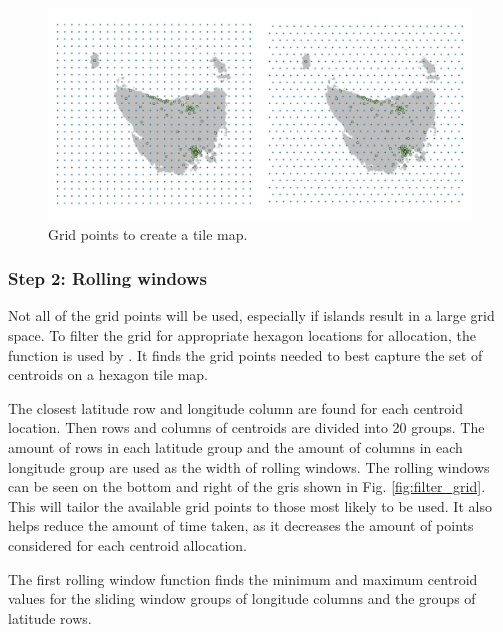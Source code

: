\documentclass[
]{jss}
\begin{document}
\begin{CodeChunk}
\begin{figure}

{\centering \includegraphics[width=1\linewidth]{figures/2grid} 

}

\caption[Grid points to create a tile map]{Grid points to create a tile map.}\label{fig:grid2}
\end{figure}
\end{CodeChunk}

\hypertarget{step-2-rolling-windows}{%
\subsubsection{Step 2: Rolling windows}\label{step-2-rolling-windows}}

Not all of the grid points will be used, especially if islands result in
a large grid space. To filter the grid for appropriate hexagon locations
for allocation, the  function is used by
. It finds the grid points needed to best capture the
set of centroids on a hexagon tile map.

The closest latitude row and longitude column are found for each
centroid location. Then rows and columns of centroids are divided into
20 groups. The amount of rows in each latitude group and the amount of
columns in each longitude group are used as the width of rolling
windows. The rolling windows can be seen on the bottom and right of the
gris shown in Fig. \ref{fig:filter_grid}. This will tailor the available
grid points to those most likely to be used. It also helps reduce the
amount of time taken, as it decreases the amount of points considered
for each centroid allocation.

The first rolling window function finds the minimum and maximum centroid
values for the sliding window groups of longitude columns and the groups
of latitude rows.
\end{document}
